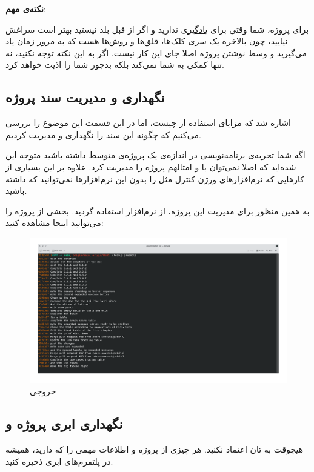   \textbf{نکته‌ی مهم}:
  
  برای پروژه، شما وقتی برای \underline{یادگیری} \lr{\LaTeX } ندارید و اگر از قبل بلد نیستید بهتر است سراغش نیایید، چون بالاخره یک سری کلک‌ها، قلق‌ها و روش‌ها هست که به مرور زمان یاد می‌گیرید و وسط نوشتن پروژه اصلا جای این کار نیست. اگر به این نکته توجه نکنید، نه تنها \lr{\LaTeX } کمکی به شما نمی‌کند بلکه بدجور شما را اذیت خواهد کرد.

\subsection{نگهداری و مدیریت سند پروژه}
اشاره شد که مزایای استفاده از \lr{\LaTeX } چیست، اما در این قسمت این موضوع را بررسی می‌کنیم که چگونه این سند را نگهداری و مدیریت کردیم.

اگه شما تجربه‌ی برنامه‌نویسی در اندازه‌ی یک پروژه‌‌ی متوسط داشته باشید متوجه این شده‌‌اید که اصلا نمی‌توان با  و امثالهم پروژه را مدیریت کرد. علاوه بر این بسیاری از کار‌هایی که نرم‌افزار‌‌های ورژن کنترل مثل  را بدون این نرم‌افزار‌ها نمی‌توانید که داشته باشید.

به همین منظور برای مدیریت 
 این پروژه‌، از نرم‌افزار  استفاده گردید.
 بخشی از  پروژه را می‌توانید اینجا مشاهده کنید:
 \begin{figure}[H]
 	\caption{خروجی }
 	\begin{center}
 		\includegraphics[angle=90, width=\textwidth, height=\textheight]{./images/log}
 	\end{center}
 \end{figure}

\subsection{نگهداری ابری پروژه و }
هیچوقت به تان اعتماد نکنید. هر چیزی از پروژه و اطلاعات مهمی را که دارید، همیشه در پلتفرم‌های ابری ذخیره کنید.

